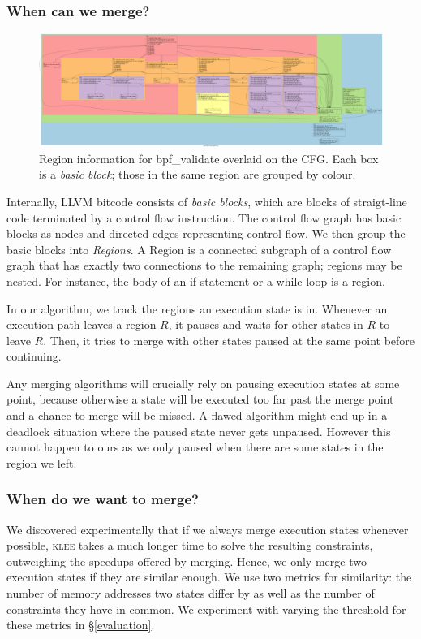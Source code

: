 \documentclass[12pt,a4paper]{article}
\newcommand{\klee}{\textsc{klee }}
\begin{document}
\subsubsection{When can we merge?}

\begin{figure}
  \centering
    \includegraphics[width=\textwidth]{reg.png}
  \caption{Region information for bpf\_validate overlaid on the CFG. Each box is a \emph{basic block}; those in the same region are grouped by colour.}
\end{figure}

Internally, LLVM bitcode consists of \emph{basic blocks}, which are blocks of straigt-line code terminated by a control flow instruction. The control flow graph has basic blocks as nodes and directed edges representing control flow. We then group the basic blocks into \emph{Regions}. A Region \cite{regions} is a connected subgraph of a control flow graph that has exactly two connections to the remaining graph; regions may be nested. For instance, the body of an if statement or a while loop is a region.

In our algorithm, we track the regions an execution state is in. Whenever an execution path leaves a region $R$, it pauses and waits for other states in $R$ to leave $R$. Then, it tries to merge with other states paused at the same point before continuing. 

Any merging algorithms will crucially rely on pausing execution states at some point, because otherwise a state will be executed too far past the merge point and a chance to merge will be missed. A flawed algorithm might end up in a deadlock situation where the paused state never gets unpaused. However this cannot happen to ours as we only paused when there are some states in the region we left.

\subsubsection{When do we want to merge?}
We discovered experimentally that if we always merge execution states whenever possible, \klee takes a much longer time to solve the resulting constraints, outweighing the speedups offered by merging. Hence, we only merge two execution states if they are similar enough. We use two metrics for similarity: the number of memory addresses two states differ by as well as the number of constraints they have in common. We experiment with varying the threshold for these metrics in \S\ref{evaluation}.
\end{document}
